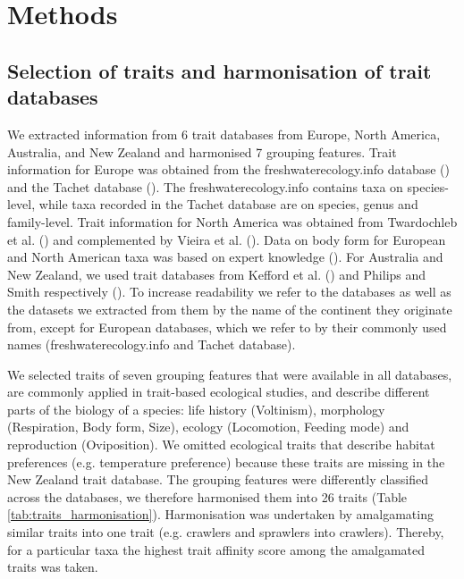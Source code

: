 \documentclass{article}
\begin{document}
\newpage

\section*{Methods}

\subsection*{Selection of traits and harmonisation of trait databases}

We extracted information from 6 trait databases from Europe, North America, Australia, and New Zealand and harmonised 7 grouping features. Trait information for Europe was obtained from the freshwaterecology.info database (\cite{schmidt-kloiber_www.freshwaterecology.info_2015}) and the Tachet database (\cite{usseglio-polatera_biomonitoring_2000}). The freshwaterecology.info contains taxa on species-level, while taxa recorded in the Tachet database are on species, genus and family-level. Trait information for North America was obtained from Twardochleb et al. (\cite{twardochleb_trait_data_2020}) and complemented by Vieira et al. (\cite{vieira_database_nodate}). Data on body form for European and North American taxa was based on expert knowledge (\cite{polatera_personal_information_2020}). For Australia and New Zealand, we used trait databases from Kefford et al. (\cite{kefford_integrated_2020}) and Philips and Smith respectively (\cite{Philips_and_Smith_NZ_DB_2018}). To increase readability we refer to the databases as well as the datasets we extracted from them by the name of the continent they originate from, except for European databases, which we refer to by their commonly used names (freshwaterecology.info and Tachet database). 
 
We selected traits of seven grouping features that were available in all databases, are commonly applied in trait-based ecological studies, and describe different parts of the biology of a species: life history (Voltinism), morphology (Respiration, Body form, Size), ecology (Locomotion, Feeding mode) and reproduction (Oviposition). We omitted ecological traits that describe habitat preferences (e.g. temperature preference) because these traits are missing in the New Zealand trait database. The grouping features were differently classified across the databases, we therefore harmonised them into 26 traits (Table \ref{tab:traits_harmonisation}). Harmonisation was undertaken by amalgamating similar traits into one trait (e.g. crawlers and sprawlers into crawlers). Thereby, for a particular taxa the highest trait affinity score among the amalgamated traits was taken. 
\end{document}
